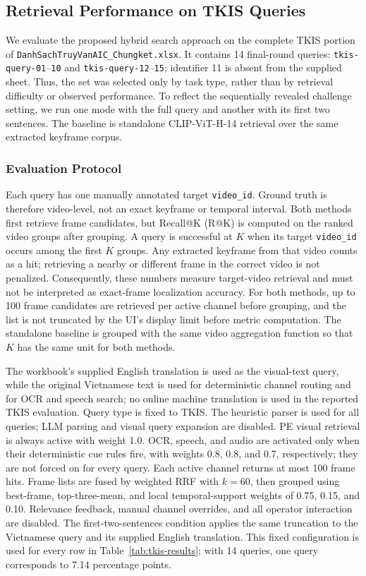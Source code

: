 \documentclass[conference]{IEEEtran}
\newcommand{\vid}{\texttt{video\_id}}
\begin{document}
\subsection{Retrieval Performance on TKIS Queries}

We evaluate the proposed hybrid search approach on the complete TKIS portion of
\texttt{DanhSachTruyVanAIC\_Chungket.xlsx}. It contains 14 final-round queries:
\texttt{tkis-query-01}--\texttt{10} and \texttt{tkis-query-12}--\texttt{15};
identifier 11 is absent from the supplied sheet. Thus, the set was selected only
by task type, rather than by retrieval difficulty or observed performance. To
reflect the sequentially revealed challenge setting, we run one mode with the
full query and another with its first two sentences. The baseline is standalone
CLIP-ViT-H-14 retrieval over the same extracted keyframe corpus.

\subsubsection{Evaluation Protocol}

Each query has one manually annotated target \vid{}. Ground truth is therefore
video-level, not an exact keyframe or temporal interval. Both methods first
retrieve frame candidates, but Recall@K (R@K) is computed on the ranked video
groups after grouping. A query is successful at $K$ when its target \vid{}
occurs among the first $K$ groups. Any extracted keyframe from that video counts
as a hit; retrieving a nearby or different frame in the correct video is not
penalized. Consequently, these numbers measure target-video retrieval and must
not be interpreted as exact-frame localization accuracy. For both methods, up
to 100 frame candidates are retrieved per active channel before grouping, and
the list is not truncated by the UI's display limit before metric computation.
The standalone baseline is grouped with the same video aggregation function so
that $K$ has the same unit for both methods.

The workbook's supplied English translation is used as the visual-text query,
while the original Vietnamese text is used for deterministic channel routing and
for OCR and speech search; no online machine translation is used in the reported
TKIS evaluation. Query type is fixed to TKIS. The heuristic parser is used for
all queries; LLM parsing and visual query expansion are disabled. PE visual
retrieval is always active with weight 1.0. OCR, speech, and audio are activated
only when their deterministic cue rules fire, with weights 0.8, 0.8, and 0.7,
respectively; they are not forced on for every query. Each active channel returns
at most 100 frame hits. Frame lists are fused by weighted RRF with $k=60$, then
grouped using best-frame, top-three-mean, and local temporal-support weights of
0.75, 0.15, and 0.10. Relevance feedback, manual channel overrides, and all
operator interaction are disabled. The first-two-sentences condition applies
the same truncation to the Vietnamese query and its supplied English
translation. This fixed configuration is used for every row in
Table~\ref{tab:tkis-results}; with 14 queries, one query corresponds to 7.14
percentage points.
\end{document}
